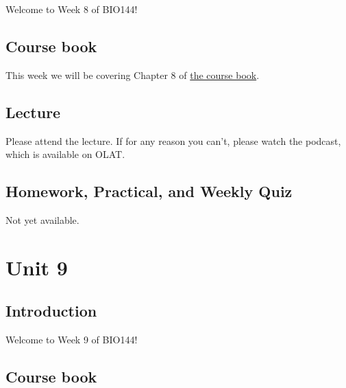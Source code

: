 \documentclass[
  letterpaper,
  8pt,
  a4paper]{book}
\begin{document}

Welcome to Week 8 of BIO144!

\section*{Course book}\label{course-book-7}


This week we will be covering Chapter 8 of
\href{https://opetchey.github.io/BIO144_Course_Book/}{the course book}.

\section*{Lecture}\label{lecture-7}


Please attend the lecture. If for any reason you can't, please watch the
podcast, which is available on OLAT.

\section*{Homework, Practical, and Weekly
Quiz}\label{homework-practical-and-weekly-quiz-7}


Not yet available.


\chapter*{Unit 9}\label{unit-9}


\section*{Introduction}\label{introduction-9}


Welcome to Week 9 of BIO144!

\section*{Course book}\label{course-book-8}
\end{document}
